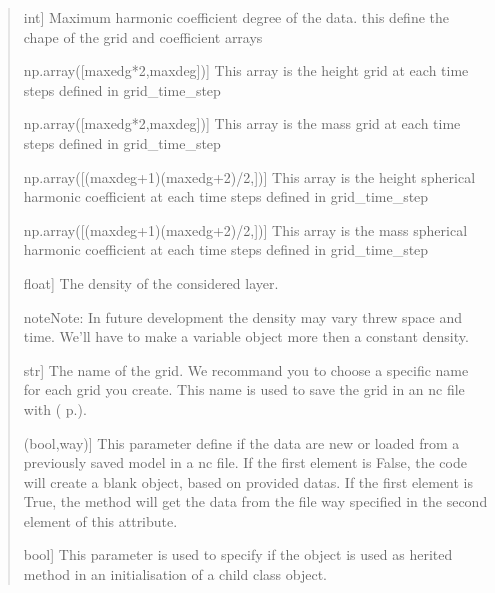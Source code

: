 \documentclass[letterpaper,10pt,english]{sphinxmanual}
\renewcommand{\hyperref}[2][]{(#2 p.\pageref{#1})}
\begin{document}
\begin{fulllineitems}
\begin{quote}
\begin{description}
\sphinxlineitem{maxdeg}{[}int{]}
\sphinxAtStartPar
Maximum harmonic coefficient degree of the data. this define the chape of the grid and coefficient arrays

\sphinxlineitem{height\_time\_grid}{[}np.array({[}maxedg*2,maxdeg{]}){]}
\sphinxAtStartPar
This array is the height grid at each time steps defined in grid\_time\_step

\sphinxlineitem{mass\_time\_grid}{[}np.array({[}maxedg*2,maxdeg{]}){]}
\sphinxAtStartPar
This array is the mass grid at each time steps defined in grid\_time\_step

\sphinxlineitem{height\_time\_coeff}{[}np.array({[}(maxdeg+1)(maxedg+2)/2,{]}){]}
\sphinxAtStartPar
This array is the height spherical harmonic coefficient at each time steps defined in grid\_time\_step

\sphinxlineitem{mass\_time\_coeff}{[}np.array({[}(maxdeg+1)(maxedg+2)/2,{]}){]}
\sphinxAtStartPar
This array is the mass spherical harmonic coefficient at each time steps defined in grid\_time\_step

\sphinxlineitem{rho}{[}float{]}
\sphinxAtStartPar
The density of the considered layer.

\end{description}

\begin{sphinxadmonition}{note}{Note:}
\sphinxAtStartPar
In future development the density may vary threw space and time. We’ll have to make a variable object more then a constant density.
\end{sphinxadmonition}
\begin{description}
\sphinxlineitem{grid\_name}{[}str{]}
\sphinxAtStartPar
The name of the grid. We recommand you to choose a specific name for each grid you create. This name is used to save the grid in an nc file with {\hyperref[\detokenize{GRID_doc/TIME_GRID_doc:save}]{\sphinxcrossref{save}}}.

\sphinxlineitem{from\_file}{[}(bool,way){]}
\sphinxAtStartPar
This parameter define if the data are new or loaded from a previously saved model in a nc file. If the first element is False, the code will create a blank object, based on provided datas. If the first element is True, the method will get the data from the file way specified in the second element of this attribute.

\sphinxlineitem{superinit}{[}bool{]}
\sphinxAtStartPar
This parameter is used to specify if the object is used as herited method in an initialisation of a child class object.


\end{description}
\end{quote}
\end{fulllineitems}
\end{document}
